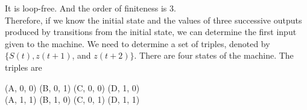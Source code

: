\documentclass[8pt]{beamer}
\begin{document}
\begin{frame}
\hspace*{0.5cm} It is loop-free. And the order of finiteness is 3.\\
\hspace*{0.5cm} Therefore, if we know the initial state and the values of three successive outputs produced by
transitions from the initial state, we can determine the first input given to the machine. We need
to determine a set of triples, denoted by $\{S(t), z(t + 1)$, and $z(t + 2)\}$. There are four states of the
machine. The triples are\\

\vspace*{0.4cm}
\begin{center}

  (A, 0, 0)  \hspace*{0.3cm}  (B, 0, 1)   \hspace*{0.3cm}   (C, 0, 0)    \hspace*{0.3cm}   (D, 1, 0)\\
  (A, 1, 1)  \hspace*{0.3cm}  (B, 1, 0)   \hspace*{0.3cm}   (C, 0, 1)    \hspace*{0.3cm}   (D, 1, 1)\\

\end{center}
\end{frame}
\end{document}

